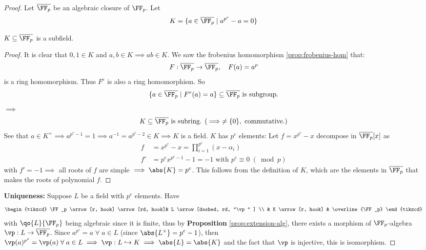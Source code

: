 \begin{proof}
	Let \( \overline{\FF_p} \) be an algebraic closure of \( \FF_p \). Let
	\[
		K = \{a\in \overline{\FF_p} \; | \; a^{p^e} - a= 0\}
	\]
	\begin{claim}
		\( K \subseteq \overline{\FF_p} \) is a subfield.
	\end{claim}

	\begin{proof}
		It is clear that \( 0,1\in K \) and \( a,b\in K \implies ab \in K \). We saw the frobenius
		homomorphism \ref{prop:frobenius-hom} that:
		\[
			F: \overline{\FF_p} \to \overline{\FF_p}, \quad F(a) = a^p
		\]
		is a ring homomorphism. Thus \( F^e \) is also a ring homomorphism. So
		\[
			\{a \in \overline{\FF_p} \; | \; F^e(a) = a\} \subseteq \overline{\FF_p} \text{ is subgroup.}
		\]
		\( \implies \)
		\[
			K \subseteq \overline{\FF_p} \text{ is subring. } (\implies \ne \{0\}, \text{ commutative.})
		\]
		See that \( a \in K^\times \implies a^{p^e-1} = 1 \implies a^{-1} = a^{p^e - 2} \in K \implies K \) is a field.
		\( K \) has \( p^e \) elements: Let \( f = x^{p^e} - x \) decompose in \( \overline{\FF_p}[x] \)
		as
		\[
			\begin{aligned}
				f  & = x^{p^e} -x = \prod_{i=1}^{p^e} (x-\alpha_i)                     \\
				f' & = p^e x^{p^e-1} - 1 = -1 \text{ with } p^e \equiv 0 \; (\bmod{p})
			\end{aligned}
		\]
		with \( f' = -1 \implies \) all roots of \( f \) are simple \( \implies \abs{K} = p^e \). This
		follows from the definition of \( K \), which are the elements in \( \overline{\FF_p} \) that
		makes the roots of polynomial \( f \).
	\end{proof}
	\textbf{Uniqueness:} Suppose \( L \) be a field with \( p^e \) elements. Have
	\[
		\begin{tikzcd}
			\FF_p \arrow[r, hook] \arrow[rd, hook]& L \arrow[dashed, rd, "\vp" ]  \\
			& K \arrow[r, hook] & \overline{\FF_p}
		\end{tikzcd}
	\]
	with \( \qo{L}{\FF_p} \) being algebraic since it is finite, thus by \textbf{Proposition}
	\ref{prop:extension-alg}, there exists a morphism of \( \FF_p \)-algebra \( \vp: L \to
	\overline{\FF_p} \). Since \( a^{p^e} = a \; \forall \; a\in L \) (since \( \abs{L^\times} = p^e -
	1\)), then \( \vp(a)^{p^e} = \vp(a) \; \forall \; a\in L \implies \vp: L \hookrightarrow K
	\implies \abs{L} = \abs{K} \) and the fact that \( \vp \) is injective, this is isomorphism.
\end{proof}


